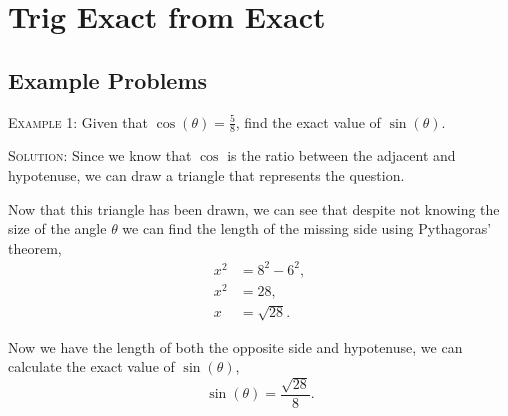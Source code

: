 \documentclass[a4paper,12pt]{article}
\begin{document}
\large
\section*{Trig Exact from Exact}

\subsection*{Example Problems}

\textsc{Example 1}: Given that $\cos(\theta) = \frac{5}{8}$, 
find the exact value of $\sin(\theta)$.

\textsc{Solution}: Since we know that $\cos$ is the 
ratio between the adjacent and hypotenuse, we can draw
a triangle that represents the question.

\begin{figure}[h]
\centering
{}
\end{figure}

Now that this triangle has been drawn, we can see that
despite not knowing the size of the angle $\theta$ we
can find the length of the missing side using Pythagoras'
theorem,
\begin{align*}
x^2 &= 8^2 - 6^2, \\
x^2 &= 28, \\
x &= \sqrt{28}.
\end{align*}

\begin{figure}[h]
\centering
{}
\end{figure}

Now we have the length of both the opposite side and 
hypotenuse, we can calculate the exact value of 
$\sin(\theta)$,
$$\sin(\theta) = \frac{\sqrt{28}}{8}.$$
\end{document}
